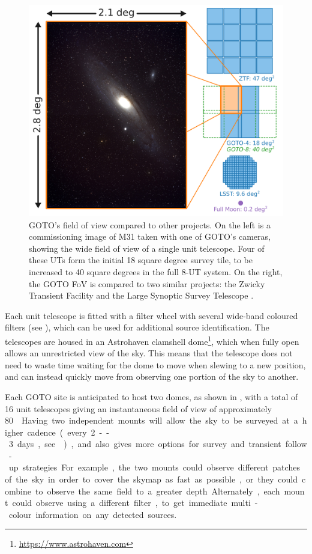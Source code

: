 \begin{colsection}
\begin{figure}[p]
    \begin{center}
        \includegraphics[width=\linewidth]{images/fov.pdf}
    \end{center}
    \caption[GOTO's field of view compared to other projects]{
        GOTO's field of view compared to other projects. On the left is a commissioning image of M31 taken with one of GOTO's cameras, showing the wide field of view of a single unit telescope. Four of these UTs form the initial 18 square degree survey tile, to be increased to 40 square degrees in the full 8-UT system. On the right, the GOTO FoV is compared to two similar projects: the Zwicky Transient Facility  \citep[ZTF,][]{ZTF} and the Large Synoptic Survey Telescope  \citep[LSST,][]{LSST}.
    }\label{fig:fov}
\end{figure}

Each unit telescope is fitted with a filter wheel with several wide-band coloured filters (see ), which can be used for additional source identification. The telescopes are housed in an Astrohaven clamshell dome\footnote{\url{https://www.astrohaven.com}}, which when fully open allows an unrestricted view of the sky. This means that the telescope does not need to waste time waiting for the dome to move when slewing to a new position, and can instead quickly move from observing one portion of the sky to another.

Each GOTO site is anticipated to host two domes, as shown in , with a total of 16 unit telescopes giving an instantaneous field of view of approximately \SI{80}{\square\deg}. Having two independent mounts will allow the sky to be surveyed at a higher cadence (every 2--3 days, see ), and also gives more options for survey and transient follow-up strategies. For example, the two mounts could observe different patches of the sky in order to cover the skymap as fast as possible, or they could combine to observe the same field to a greater depth. Alternately, each mount could observe using a different filter, to get immediate multi-colour information on any detected sources.


\end{colsection}
